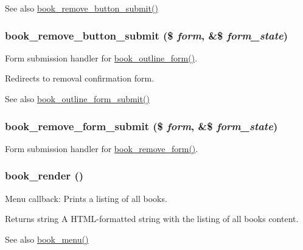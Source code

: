 \begin{DoxySeeAlso}{See also}
\hyperlink{book_8pages_8inc_abcf4790efab7bbb44fda88de9ed0847e}{book\_\-remove\_\-button\_\-submit()} 
\end{DoxySeeAlso}
\hypertarget{book_8pages_8inc_abcf4790efab7bbb44fda88de9ed0847e}{
\subsubsection[{book\_\-remove\_\-button\_\-submit}]{\setlength{\rightskip}{0pt plus 5cm}book\_\-remove\_\-button\_\-submit (\$ {\em form}, \/  \&\$ {\em form\_\-state})}}
\label{book_8pages_8inc_abcf4790efab7bbb44fda88de9ed0847e}
Form submission handler for \hyperlink{group__forms_ga4903d29a89909f072c1aab2f8d718bdb}{book\_\-outline\_\-form()}.

Redirects to removal confirmation form.

\begin{DoxySeeAlso}{See also}
\hyperlink{book_8pages_8inc_ad5f27af5889dbe2ad72df81fd4cd2665}{book\_\-outline\_\-form\_\-submit()} 
\end{DoxySeeAlso}
\hypertarget{book_8pages_8inc_aca2b07a50dae6ef3a271b984dae19c7e}{
\subsubsection[{book\_\-remove\_\-form\_\-submit}]{\setlength{\rightskip}{0pt plus 5cm}book\_\-remove\_\-form\_\-submit (\$ {\em form}, \/  \&\$ {\em form\_\-state})}}
\label{book_8pages_8inc_aca2b07a50dae6ef3a271b984dae19c7e}
Form submission handler for \hyperlink{group__forms_gab7e8aa290196982f23b50a984e215805}{book\_\-remove\_\-form()}. \hypertarget{book_8pages_8inc_ab9a467483a4cc1909dc16838d6760eea}{
\subsubsection[{book\_\-render}]{\setlength{\rightskip}{0pt plus 5cm}book\_\-render ()}}
\label{book_8pages_8inc_ab9a467483a4cc1909dc16838d6760eea}
Menu callback: Prints a listing of all books.

\begin{DoxyReturn}{Returns}
string A HTML-\/formatted string with the listing of all books content.
\end{DoxyReturn}
\begin{DoxySeeAlso}{See also}
\hyperlink{book_8module_adc2bbd5235a769fa1ae9b02e8effc15e}{book\_\-menu()} 
\end{DoxySeeAlso}
